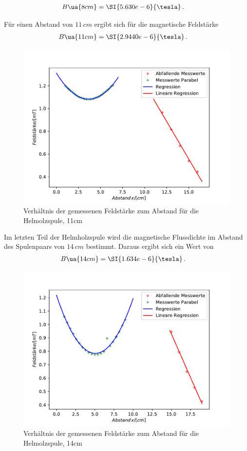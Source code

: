 
\begin{align}
B\ua{8cm} &= \SI{5.630e-6}{\tesla}\,.
\end{align}

\newpage
Für einen Abstand von $11 \, cm$ ergibt sich für die magnetische Feldstärke
\begin{align}
B\ua{11cm} &= \SI{2.9440e-6}{\tesla}\,.
\end{align}
\begin{figure}
  \centering
  \includegraphics[width = 12 cm]{Helmholzspule11.pdf}
  \caption{Verhältnis der gemessenen Feldstärke zum Abstand für die Helmolzspule, 11cm}
  \label{fig:Messungb}
\end{figure}

\newpage
Im letzten Teil der Helmholzspule wird die magnetische Flussdichte im Abstand des
Spulenpaars von $14 \, cm$ bestimmt. Daraus ergibt sich ein Wert von
\begin{align}
B\ua{14cm} &= \SI{1.634e-6}{\tesla}\,.
\end{align}
\begin{figure}
  \centering
  \includegraphics[width = 12 cm]{Helmholzspule14.pdf}
  \caption{Verhältnis der gemessenen Feldstärke zum Abstand für die Helmolzspule, 14cm}
  \label{fig:Messungb}
\end{figure}
\newpage


